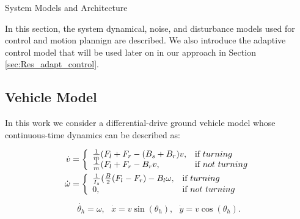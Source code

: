 \begin{section}{System Models and Architecture}
	
\label{sec:modeling}
In this section, the system dynamical, noise, and disturbance models used for control and motion plannign are described. We also introduce the adaptive control model that will be used later on in our approach in Section \ref{sec:Res_adapt_control}.


\subsection{Vehicle Model}
In this work we consider a differential-drive ground vehicle model \cite{nutaro2011building} whose continuous-time dynamics can be described as:

	\begin{equation}
    \begin{split}
    \label{eqn:plant}
    \dot{v}&=\left\{
    \begin{array}{ll}
    \frac{1}{m}(F_l+F_r-(B_s+B_r)v, & \hbox{if } turning\\
    \frac{1}{m}(F_l+F_r-B_rv, & \hbox{if } not~turning
    \end{array}
    \right.\\
    \dot{\omega}&=\left\{
    \begin{array}{ll}
    \frac{1}{I_z}(\frac{B}{2}(F_l-F_r)-B_l\omega, & \hbox{if } turning\\
    0, & \hbox{if } not~turning
    \end{array}
    \right.\\
    \end{split}
    \end{equation}
    \begin{align}
     \dot{\theta_h}=\omega,\text{ } \dot{x}=v\sin(\theta_h),\text{ } \dot{y}=v\cos(\theta_h).
	\end{align}
	

\end{section}
